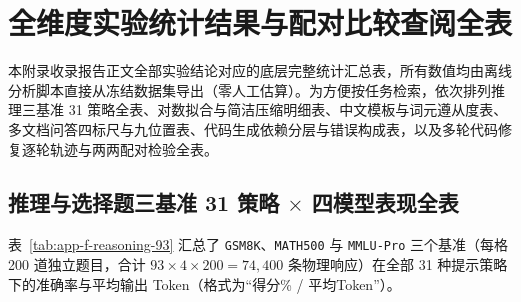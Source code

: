 \chapter{全维度实验统计结果与配对比较查阅全表}\label{app:stats}

本附录收录报告正文全部实验结论对应的底层完整统计汇总表，所有数值均由离线分析脚本直接从冻结数据集导出（零人工估算）。为方便按任务检索，依次排列推理三基准 31 策略全表、对数拟合与简洁压缩明细表、中文模板与词元遵从度表、多文档问答四标尺与九位置表、代码生成依赖分层与错误构成表，以及多轮代码修复逐轮轨迹与两两配对检验全表。

\section{推理与选择题三基准 31 策略 $\times$ 四模型表现全表}

表~\ref{tab:app-f-reasoning-93} 汇总了 \texttt{GSM8K}、\texttt{MATH500} 与 \texttt{MMLU-Pro} 三个基准（每格 200 道独立题目，合计 $93\times 4\times 200 = 74{,}400$ 条物理响应）在全部 31 种提示策略下的准确率与平均输出 Token（格式为“得分\% / 平均Token”）。

